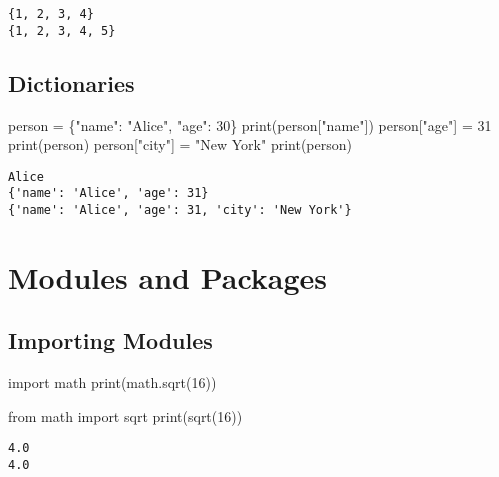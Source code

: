 \documentclass[
  letterpaper,
  DIV=11,
  numbers=noendperiod]{scrreprt}
\newenvironment{Shaded}{\begin{snugshade}}{\end{snugshade}}
\newcommand{\BuiltInTok}[1]{\textcolor[rgb]{0.00,0.23,0.31}{#1}}
\newcommand{\DecValTok}[1]{\textcolor[rgb]{0.68,0.00,0.00}{#1}}
\newcommand{\ImportTok}[1]{\textcolor[rgb]{0.00,0.46,0.62}{#1}}
\newcommand{\NormalTok}[1]{\textcolor[rgb]{0.00,0.23,0.31}{#1}}
\newcommand{\OperatorTok}[1]{\textcolor[rgb]{0.37,0.37,0.37}{#1}}
\newcommand{\StringTok}[1]{\textcolor[rgb]{0.13,0.47,0.30}{#1}}
\begin{document}
\begin{verbatim}
{1, 2, 3, 4}
{1, 2, 3, 4, 5}
\end{verbatim}

\subsection{Dictionaries}\label{dictionaries-1}

\begin{Shaded}
\begin{Highlighting}[]
\NormalTok{person }\OperatorTok{=}\NormalTok{ \{}\StringTok{"name"}\NormalTok{: }\StringTok{"Alice"}\NormalTok{, }\StringTok{"age"}\NormalTok{: }\DecValTok{30}\NormalTok{\}}
\BuiltInTok{print}\NormalTok{(person[}\StringTok{"name"}\NormalTok{])}
\NormalTok{person[}\StringTok{"age"}\NormalTok{] }\OperatorTok{=} \DecValTok{31}
\BuiltInTok{print}\NormalTok{(person)}
\NormalTok{person[}\StringTok{"city"}\NormalTok{] }\OperatorTok{=} \StringTok{"New York"}
\BuiltInTok{print}\NormalTok{(person)}
\end{Highlighting}
\end{Shaded}

\begin{verbatim}
Alice
{'name': 'Alice', 'age': 31}
{'name': 'Alice', 'age': 31, 'city': 'New York'}
\end{verbatim}

\section{Modules and Packages}\label{modules-and-packages}

\subsection{Importing Modules}\label{importing-modules-1}

\begin{Shaded}
\begin{Highlighting}[]
\ImportTok{import}\NormalTok{ math}
\BuiltInTok{print}\NormalTok{(math.sqrt(}\DecValTok{16}\NormalTok{))}

\ImportTok{from}\NormalTok{ math }\ImportTok{import}\NormalTok{ sqrt}
\BuiltInTok{print}\NormalTok{(sqrt(}\DecValTok{16}\NormalTok{))}
\end{Highlighting}
\end{Shaded}

\begin{verbatim}
4.0
4.0
\end{verbatim}
\end{document}

